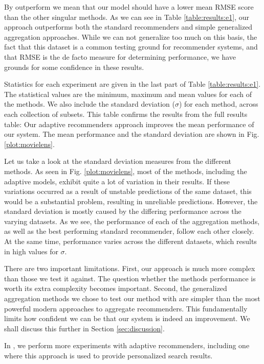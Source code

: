 By outperform we mean that our model should have a lower
mean RMSE score than the other singular methods. As we can see in Table \ref{table:results:e1},
our approach outperforms both the standard recommenders
and simple generalized aggregation approaches.
While we can not generalize too much on this basis, 
the fact that this dataset is a common testing ground for recommender systems,
and that RMSE is the de facto measure for determining performance,
we have grounds for some confidence in these results.



Statistics for each experiment are given in the last
part of Table \ref{table:results:e1}. 
The statistical values are the minimum, maximum and mean values
for each of the methods. We also include
the standard deviation ($\sigma$) for each method,
across each collection of subsets.
This table confirms the results from the full results table:
Our adaptive recommenders approach improves the mean performance
of our system.
The mean performance and the standard deviation
are shown in Fig. \ref{plot:movielens}.


%

Let us take a look at the standard deviation measures from the different methods.
As seen in Fig. \ref{plot:movielens}, 
most of the methods, including the adaptive models,
exhibit quite a lot of variation in their results.
If these variations occurred as a result of unstable
predictions of the same dataset, this would be a substantial problem,
resulting in unreliable predictions.
However, the standard deviation is mostly caused by the differing
performance across the varying datasets.
As we see, the performance of each of the aggregation methods,
as well as the best performing standard recommender,
follow each other closely. At the same time,
performance varies across the different datasets,
which results in high values for $\sigma$.

There are two important limitations.
First, our approach is much more complex than those we test it against.
The question whether the methods performance is worth its extra complexity becomes important.
Second, the generalized aggregation methods we chose to test our method with
are simpler than the most powerful modern approaches to aggregate recommenders.
This fundamentally limits how confident we can be that our system
is indeed an improvement.
We shall discuss this further in Section \ref{sec:discussion}.

In \cite{Bjorkoy2011}, we perform more experiments with adaptive recommenders,
including one where this approach is used to provide personalized search results.


